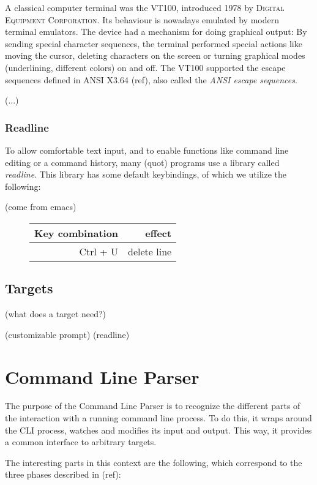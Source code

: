 \documentclass[twoside]{scrreprt}
\begin{document}
A classical computer terminal was the \textsc{VT100}, introduced 1978 by \textsc{Digital Equipment Corporation}. Its behaviour is nowadays emulated by modern terminal emulators. The device had a mechanism for doing graphical output: By sending special character sequences, the terminal performed special actions like moving the cursor, deleting characters on the screen or turning graphical modes (underlining, different colors) on and off. The \textsc{VT100} supported the escape sequences defined in ANSI X3.64 (ref), also called the \emph{ANSI escape sequences}.

(...)

\subsection{Readline}

To allow comfortable text input, and to enable functions like command line editing or a command history, many (quot) programs use a library called \emph{readline}. This library has some default keybindings, of which we utilize the following:

(come from emacs)

\begin{figure}
    \begin{tabular}{r|r}
        Key combination & effect \\
        \hline
        Ctrl + U & delete line \\
    \end{tabular}
\end{figure}

\section{Targets}

(what does a target need?)

(customizable prompt)
(readline)

\chapter{Command Line Parser}

The purpose of the Command Line Parser is to recognize the different parts of the interaction with a running command line process. To do this, it wraps around the \textsc{CLI} process, watches and modifies its input and output. This way, it provides a common interface to arbitrary targets.

The interesting parts in this context are the following, which correspond to the three phases described in (ref):
\end{document}
